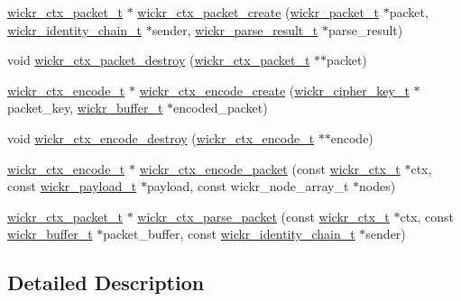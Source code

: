 \begin{DoxyCompactItemize}
\mbox{\hyperlink{structwickr__ctx__packet}{wickr\+\_\+ctx\+\_\+packet\+\_\+t}} $\ast$ \mbox{\hyperlink{group__wickr__ctx_ga8ac1e1c9a0b9802d7f259278a09df56c}{wickr\+\_\+ctx\+\_\+packet\+\_\+create}} (\mbox{\hyperlink{structwickr__packet}{wickr\+\_\+packet\+\_\+t}} $\ast$packet, \mbox{\hyperlink{structwickr__identity__chain}{wickr\+\_\+identity\+\_\+chain\+\_\+t}} $\ast$sender, \mbox{\hyperlink{structwickr__parse__result}{wickr\+\_\+parse\+\_\+result\+\_\+t}} $\ast$parse\+\_\+result)
\item 
void \mbox{\hyperlink{group__wickr__ctx_gad7063bcfca4878d290e598ed6bc22e3c}{wickr\+\_\+ctx\+\_\+packet\+\_\+destroy}} (\mbox{\hyperlink{structwickr__ctx__packet}{wickr\+\_\+ctx\+\_\+packet\+\_\+t}} $\ast$$\ast$packet)
\item 
\mbox{\hyperlink{structwickr__ctx__encode}{wickr\+\_\+ctx\+\_\+encode\+\_\+t}} $\ast$ \mbox{\hyperlink{group__wickr__ctx_ga810ee459cb0ab1037b5fd1f983d0ded3}{wickr\+\_\+ctx\+\_\+encode\+\_\+create}} (\mbox{\hyperlink{structwickr__cipher__key}{wickr\+\_\+cipher\+\_\+key\+\_\+t}} $\ast$packet\+\_\+key, \mbox{\hyperlink{structwickr__buffer}{wickr\+\_\+buffer\+\_\+t}} $\ast$encoded\+\_\+packet)
\item 
void \mbox{\hyperlink{group__wickr__ctx_ga9ed3f7c0f4d672a2ac562b279e2da4e1}{wickr\+\_\+ctx\+\_\+encode\+\_\+destroy}} (\mbox{\hyperlink{structwickr__ctx__encode}{wickr\+\_\+ctx\+\_\+encode\+\_\+t}} $\ast$$\ast$encode)
\item 
\mbox{\hyperlink{structwickr__ctx__encode}{wickr\+\_\+ctx\+\_\+encode\+\_\+t}} $\ast$ \mbox{\hyperlink{group__wickr__ctx_ga3766720fd6654fad791a26cd2c1161b7}{wickr\+\_\+ctx\+\_\+encode\+\_\+packet}} (const \mbox{\hyperlink{structwickr__ctx}{wickr\+\_\+ctx\+\_\+t}} $\ast$ctx, const \mbox{\hyperlink{structwickr__payload}{wickr\+\_\+payload\+\_\+t}} $\ast$payload, const wickr\+\_\+node\+\_\+array\+\_\+t $\ast$nodes)
\item 
\mbox{\hyperlink{structwickr__ctx__packet}{wickr\+\_\+ctx\+\_\+packet\+\_\+t}} $\ast$ \mbox{\hyperlink{group__wickr__ctx_ga5032fb65627a509fd9486ea9696e643d}{wickr\+\_\+ctx\+\_\+parse\+\_\+packet}} (const \mbox{\hyperlink{structwickr__ctx}{wickr\+\_\+ctx\+\_\+t}} $\ast$ctx, const \mbox{\hyperlink{structwickr__buffer}{wickr\+\_\+buffer\+\_\+t}} $\ast$packet\+\_\+buffer, const \mbox{\hyperlink{structwickr__identity__chain}{wickr\+\_\+identity\+\_\+chain\+\_\+t}} $\ast$sender)
\end{DoxyCompactItemize}


\subsection{Detailed Description}


